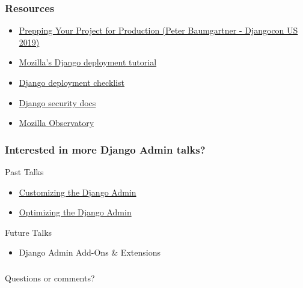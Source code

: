 \documentclass[aspectratio=169]{beamer}
\begin{document}
\begin{frame}
\frametitle{Resources}
  \begin{itemize}
    \item {\small \href{https://2019.djangocon.us/talks/prepping-your-project-for-production/}{Prepping Your Project for Production (Peter Baumgartner - Djangocon US 2019)}}
    \item {\small \href{https://developer.mozilla.org/en-US/docs/Learn/Server-side/Django/Deployment}{Mozilla's Django deployment tutorial}}
    \item {\small \href{https://docs.djangoproject.com/en/2.2/howto/deployment/checklist/}{Django deployment checklist}}
    \item {\small \href{https://docs.djangoproject.com/en/2.2/topics/security/}{Django security docs}}
    \item {\small \href{https://observatory.mozilla.org/}{Mozilla Observatory}}
  \end{itemize}
\end{frame}


\begin{frame}
\frametitle{Interested in more Django Admin talks?}
  Past Talks
  \begin{itemize}
    \item {\small \href{https://github.com/davidfischer/talk-customizing-django-admin}{Customizing the Django Admin}}
    \item {\small \href{https://github.com/davidfischer/talk-optimizing-django-admin}{Optimizing the Django Admin}}
  \end{itemize}

  \vfill

  Future Talks
  \begin{itemize}
    \item {\small Django Admin Add-Ons \& Extensions}
  \end{itemize}
\end{frame}


\begin{frame}
\frametitle{}
  {\huge Questions or comments?}
\end{frame}
\end{document}
